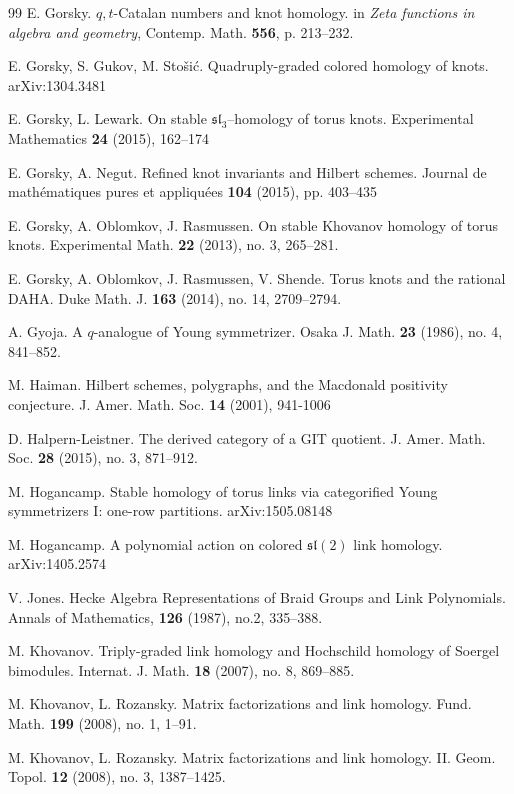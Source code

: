 \documentclass[12pt]{amsart}
\numberwithin{equation}{section}
\theoremstyle{definition}
\theoremstyle{remark}
\renewcommand{\1}{\mathbf{1}}
\newcommand{\fsl}{\mathfrak{sl}}
\begin{document}
\begin{thebibliography}{99}
 E. Gorsky. {$q,t$}-{C}atalan numbers and knot homology. in 
{\it Zeta functions in algebra and geometry}, Contemp. Math. {\bf 556}, p. 213--232. 

 E. Gorsky, S. Gukov, M. Sto\v si\'c. Quadruply-graded colored homology of knots.
 arXiv:1304.3481

 E. Gorsky, L. Lewark. On stable $\fsl_3$--homology of torus knots.
Experimental Mathematics {\bf 24} (2015), 162--174

 E. Gorsky, A. Negu\cb t. Refined knot invariants and Hilbert schemes.
 Journal de math\'ematiques pures et appliqu\'ees {\bf 104} (2015), pp. 403--435

 E. Gorsky, A. Oblomkov, J. Rasmussen. On stable Khovanov homology of torus knots.
Experimental Math. {\bf 22} (2013), no. 3, 265--281.

 E. Gorsky, A. Oblomkov, J. Rasmussen, V. Shende. Torus knots and the rational DAHA.
Duke Math. J. {\bf 163} (2014), no. 14, 2709--2794.

 A. Gyoja. A $q$-analogue of Young symmetrizer. Osaka J. Math. {\bf 23} (1986), no. 4, 841--852. 

 M. Haiman. Hilbert schemes, polygraphs, and the Macdonald positivity conjecture. 
J. Amer. Math. Soc. {\bf 14} (2001), 941-1006

 D. Halpern-Leistner.  The derived category of a GIT quotient. J. Amer. Math. Soc. {\bf 28} (2015), no. 3, 871--912.

 M. Hogancamp. Stable homology of torus links via categorified Young symmetrizers I: one-row partitions. arXiv:1505.08148

 M. Hogancamp. A polynomial action on colored $\fsl(2)$ link homology. arXiv:1405.2574

 V. Jones. Hecke Algebra Representations of Braid Groups and Link Polynomials. Annals of Mathematics, {\bf 126}  (1987), no.2, 335--388.

 M. Khovanov. Triply-graded link homology and Hochschild homology of Soergel bimodules. Internat. J. Math. {\bf 18} (2007), no. 8, 869--885.

 M. Khovanov, L. Rozansky. Matrix factorizations and link homology. Fund. Math. {\bf 199} (2008), no. 1, 1--91.

 M. Khovanov, L. Rozansky. Matrix factorizations and link homology. II. Geom. Topol. {\bf 12} (2008), no. 3, 1387--1425.


\end{thebibliography}
\end{document}
